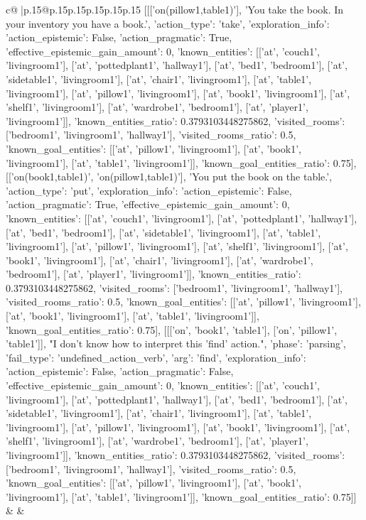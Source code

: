 \documentclass{article}
\begin{document}
{\begin{supertabular}{c@{$\;$}|p{.15\linewidth}@{}p{.15\linewidth}p{.15\linewidth}p{.15\linewidth}p{.15\linewidth}p{.15\linewidth}}
{{{	 [[['on(pillow1,table1)'], 'You take the book. In your inventory you have a book.', {'action_type': 'take', 'exploration_info': {'action_epistemic': False, 'action_pragmatic': True, 'effective_epistemic_gain_amount': 0, 'known_entities': [['at', 'couch1', 'livingroom1'], ['at', 'pottedplant1', 'hallway1'], ['at', 'bed1', 'bedroom1'], ['at', 'sidetable1', 'livingroom1'], ['at', 'chair1', 'livingroom1'], ['at', 'table1', 'livingroom1'], ['at', 'pillow1', 'livingroom1'], ['at', 'book1', 'livingroom1'], ['at', 'shelf1', 'livingroom1'], ['at', 'wardrobe1', 'bedroom1'], ['at', 'player1', 'livingroom1']], 'known_entities_ratio': 0.3793103448275862, 'visited_rooms': ['bedroom1', 'livingroom1', 'hallway1'], 'visited_rooms_ratio': 0.5, 'known_goal_entities': [['at', 'pillow1', 'livingroom1'], ['at', 'book1', 'livingroom1'], ['at', 'table1', 'livingroom1']], 'known_goal_entities_ratio': 0.75}}], [['on(book1,table1)', 'on(pillow1,table1)'], 'You put the book on the table.', {'action_type': 'put', 'exploration_info': {'action_epistemic': False, 'action_pragmatic': True, 'effective_epistemic_gain_amount': 0, 'known_entities': [['at', 'couch1', 'livingroom1'], ['at', 'pottedplant1', 'hallway1'], ['at', 'bed1', 'bedroom1'], ['at', 'sidetable1', 'livingroom1'], ['at', 'table1', 'livingroom1'], ['at', 'pillow1', 'livingroom1'], ['at', 'shelf1', 'livingroom1'], ['at', 'book1', 'livingroom1'], ['at', 'chair1', 'livingroom1'], ['at', 'wardrobe1', 'bedroom1'], ['at', 'player1', 'livingroom1']], 'known_entities_ratio': 0.3793103448275862, 'visited_rooms': ['bedroom1', 'livingroom1', 'hallway1'], 'visited_rooms_ratio': 0.5, 'known_goal_entities': [['at', 'pillow1', 'livingroom1'], ['at', 'book1', 'livingroom1'], ['at', 'table1', 'livingroom1']], 'known_goal_entities_ratio': 0.75}}], [[['on', 'book1', 'table1'], ['on', 'pillow1', 'table1']], "I don't know how to interpret this 'find' action.", {'phase': 'parsing', 'fail_type': 'undefined_action_verb', 'arg': 'find', 'exploration_info': {'action_epistemic': False, 'action_pragmatic': False, 'effective_epistemic_gain_amount': 0, 'known_entities': [['at', 'couch1', 'livingroom1'], ['at', 'pottedplant1', 'hallway1'], ['at', 'bed1', 'bedroom1'], ['at', 'sidetable1', 'livingroom1'], ['at', 'chair1', 'livingroom1'], ['at', 'table1', 'livingroom1'], ['at', 'pillow1', 'livingroom1'], ['at', 'book1', 'livingroom1'], ['at', 'shelf1', 'livingroom1'], ['at', 'wardrobe1', 'bedroom1'], ['at', 'player1', 'livingroom1']], 'known_entities_ratio': 0.3793103448275862, 'visited_rooms': ['bedroom1', 'livingroom1', 'hallway1'], 'visited_rooms_ratio': 0.5, 'known_goal_entities': [['at', 'pillow1', 'livingroom1'], ['at', 'book1', 'livingroom1'], ['at', 'table1', 'livingroom1']], 'known_goal_entities_ratio': 0.75}}]] 
	  } 
	   } 
	   } 
	 & & \\ 
 


\end{supertabular}}
\end{document}
